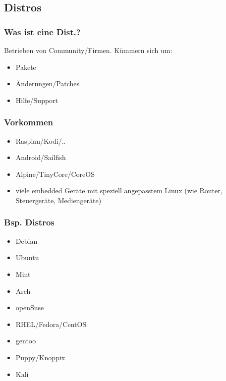 

\subsection{Distros}
\begin{frame}
\frametitle{Was ist eine Dist.?}
Betrieben von Community/Firmen.
Kümmern sich um: 
\begin{itemize}
 \item Pakete
 \item Änderungen/Patches
 \item Hilfe/Support
\end{itemize}
 
\end{frame}

\begin{frame}
 \frametitle{Vorkommen}

 
 \begin{itemize}
  \item Raspian/Kodi/..
  \item Android/Sailfish
  \item Alpine/TinyCore/CoreOS
  \item viele embedded Geräte mit speziell angepasstem Linux
 (wie Router, Steuergeräte, Mediengeräte)
 \end{itemize}

\end{frame}



\begin{frame}
\frametitle{Bsp. Distros}
\begin{itemize}[<+->]
\item Debian
\item Ubuntu
\item Mint
\item Arch
\item openSuse
\item RHEL/Fedora/CentOS 
\item gentoo
\item Puppy/Knoppix 

\item Kali 

\end{itemize}
\end{frame}


